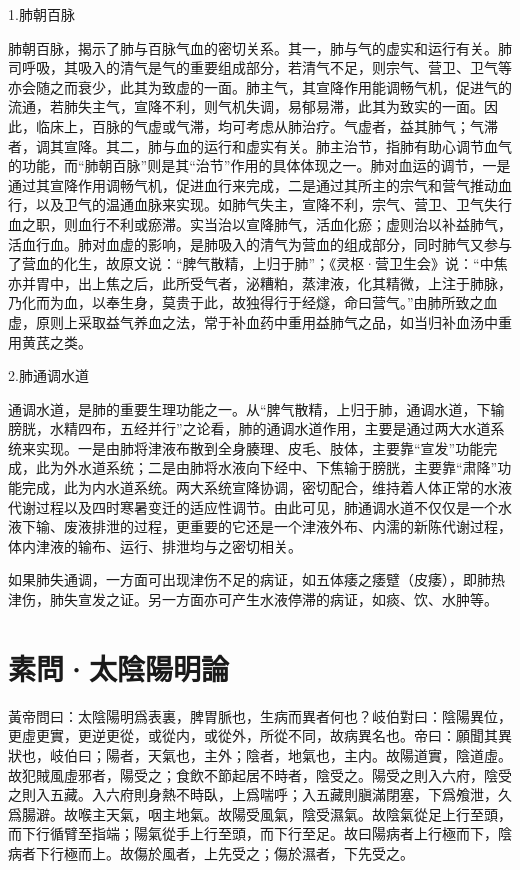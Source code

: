 \documentclass[12pt]{ctexbook}
\begin{document}

1.肺朝百脉

肺朝百脉，揭示了肺与百脉气血的密切关系。其一，肺与气的虚实和运行有关。肺司呼吸，其吸入的清气是气的重要组成部分，若清气不足，则宗气、营卫、卫气等亦会随之而衰少，此其为致虚的一面。肺主气，其宣降作用能调畅气机，促进气的流通，若肺失主气，宣降不利，则气机失调，易郁易滞，此其为致实的一面。因此，临床上，百脉的气虚或气滞，均可考虑从肺治疗。气虚者，益其肺气；气滞者，调其宣降。其二，肺与血的运行和虚实有关。肺主治节，指肺有助心调节血气的功能，而“肺朝百脉”则是其“治节”作用的具体体现之一。肺对血运的调节，一是通过其宣降作用调畅气机，促进血行来完成，二是通过其所主的宗气和营气推动血行，以及卫气的温通血脉来实现。如肺气失主，宣降不利，宗气、营卫、卫气失行血之职，则血行不利或瘀滞。实当治以宣降肺气，活血化瘀；虚则治以补益肺气，活血行血。肺对血虚的影响，是肺吸入的清气为营血的组成部分，同时肺气又参与了营血的化生，故原文说：“脾气散精，上归于肺”；《灵枢·营卫生会》说：“中焦亦并胃中，出上焦之后，此所受气者，泌糟粕，蒸津液，化其精微，上注于肺脉，乃化而为血，以奉生身，莫贵于此，故独得行于经燧，命曰营气。”由肺所致之血虚，原则上采取益气养血之法，常于补血药中重用益肺气之品，如当归补血汤中重用黄芪之类。

2.肺通调水道

通调水道，是肺的重要生理功能之一。从“脾气散精，上归于肺，通调水道，下输膀胱，水精四布，五经并行”之论看，肺的通调水道作用，主要是通过两大水道系统来实现。一是由肺将津液布散到全身腠理、皮毛、肢体，主要靠“宣发”功能完成，此为外水道系统；二是由肺将水液向下经中、下焦输于膀胱，主要靠“肃降”功能完成，此为内水道系统。两大系统宣降协调，密切配合，维持着人体正常的水液代谢过程以及四时寒暑变迁的适应性调节。由此可见，肺通调水道不仅仅是一个水液下输、废液排泄的过程，更重要的它还是一个津液外布、内濡的新陈代谢过程，体内津液的输布、运行、排泄均与之密切相关。

如果肺失通调，一方面可出现津伤不足的病证，如五体痿之痿躄（皮痿），即肺热津伤，肺失宣发之证。另一方面亦可产生水液停滞的病证，如痰、饮、水肿等。

\section{素問·太陰陽明論}%


\begin{yuanwen}
黃帝問曰：太陰陽明爲表裏，脾胃脈也，生病而異者何也？岐伯對曰：陰陽異位，更虛更實，更逆更從，或從内，或從外，所從不同，故病異名也。帝曰：願聞其異狀也，岐伯曰；陽者，天氣也，主外；陰者，地氣也，主内。故陽道實，陰道虛。故犯賊風虛邪者，陽受之；食飲不節起居不時者，陰受之。陽受之則入六府，陰受之則入五藏。入六府則身熱不時臥，上爲喘呼；入五藏則䐜滿閉塞，下爲飧泄，久爲腸澼。故喉主天氣，咽主地氣。故陽受風氣，陰受濕氣。故陰氣從足上行至頭，而下行循臂至指端；陽氣從手上行至頭，而下行至足。故曰陽病者上行極而下，陰病者下行極而上。故傷於風者，上先受之；傷於濕者，下先受之。
\end{yuanwen}
\end{document}
